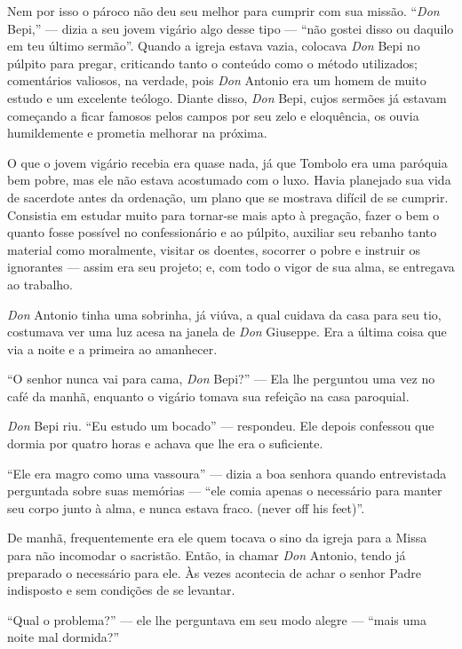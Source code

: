 \documentclass[12pt,a4paper,oneside]{book}
\begin{document}
\quad Nem por isso o pároco não deu seu melhor para cumprir com sua missão. ``\emph{Don} Bepi,'' --- dizia a seu jovem vigário algo desse tipo --- ``não gostei disso ou daquilo em teu último sermão''. Quando a igreja estava vazia, colocava \emph{Don} Bepi no púlpito para pregar, criticando tanto o conteúdo como o método utilizados; comentários valiosos, na verdade, pois \emph{Don} Antonio era um homem de muito estudo e um excelente teólogo. Diante disso, \emph{Don} Bepi, cujos sermões já estavam começando a ficar famosos pelos campos por seu zelo e eloquência, os ouvia humildemente e prometia melhorar na próxima.

\quad O que o jovem vigário recebia era quase nada, já que Tombolo era uma paróquia bem pobre, mas ele não estava acostumado com o luxo. Havia planejado sua vida de sacerdote antes da ordenação, um plano que se mostrava difícil de se cumprir. Consistia em estudar muito para tornar-se mais apto à pregação, fazer o bem o quanto fosse possível no confessionário e ao púlpito, auxiliar seu rebanho tanto material como moralmente, visitar os doentes, socorrer o pobre e instruir os ignorantes --- assim era seu projeto; e, com todo o vigor de sua alma, se entregava ao trabalho.

\quad \emph{Don} Antonio tinha uma sobrinha, já viúva, a qual cuidava da casa para seu tio, costumava ver uma luz acesa na janela de \emph{Don} Giuseppe. Era a última coisa que via a noite e a primeira ao amanhecer.

``O senhor nunca vai para cama, \emph{Don} Bepi?'' --- Ela lhe perguntou uma vez no café da manhã, enquanto o vigário tomava sua refeição na casa paroquial.

\emph{Don} Bepi riu. ``Eu estudo um bocado'' --- respondeu. Ele depois confessou que dormia por quatro horas e achava que lhe era o suficiente.

\quad ``Ele era magro como uma vassoura'' --- dizia a boa senhora quando entrevistada perguntada sobre suas memórias --- ``ele comia apenas o necessário para manter seu corpo junto à alma, e nunca estava fraco. (never off his feet)''.

\quad De manhã, frequentemente era ele quem tocava o sino da igreja para a Missa para não incomodar o sacristão. Então, ia chamar \emph{Don} Antonio, tendo já preparado o necessário para ele. Às vezes acontecia de achar o senhor Padre indisposto e sem condições de se levantar.

\quad ``Qual o problema?'' --- ele lhe perguntava em seu modo alegre --- ``mais uma noite mal dormida?''
\end{document}
